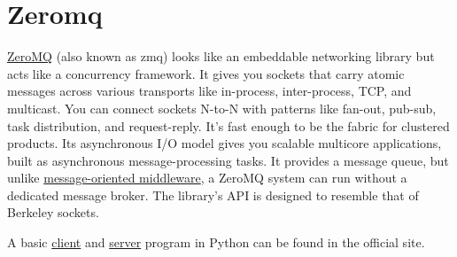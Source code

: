 \section{Zeromq}

\href{https://en.wikipedia.org/wiki/ZeroMQ}{ZeroMQ} (also known as zmq) looks
like an embeddable networking library but acts like a concurrency framework. It gives you sockets that carry atomic messages across various transports like in-process, inter-process, TCP, and multicast. You can connect sockets N-to-N with patterns like fan-out, pub-sub, task distribution, and request-reply. It's fast enough to be the fabric for clustered products. 
Its asynchronous I/O model gives you scalable multicore applications, built as asynchronous message-processing tasks. 
 It provides a message queue, but unlike
 \href{https://en.wikipedia.org/wiki/Message-oriented_middleware}{message-oriented
 middleware}, a ZeroMQ system can run without a dedicated message broker. The
 library's API is designed to resemble that of Berkeley sockets.

 A basic
 \href{http://zguide.zeromq.org/py:hwclient}{client}
 and \href{http://zguide.zeromq.org/py:hwserver}{server} 
 program in Python can be found in the official site.

 